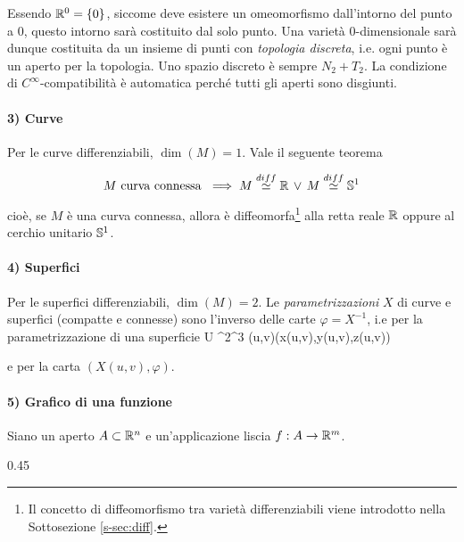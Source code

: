 Essendo $ \R^{0} = \{0\} $, siccome deve esistere un omeomorfismo dall'intorno del punto a $ 0 $, questo intorno sarà costituito dal solo punto. Una varietà 0-dimensionale sarà dunque costituita da un insieme di punti con \textit{topologia discreta}, i.e. ogni punto è un aperto per la topologia. Uno spazio discreto è sempre $ N_{2}+T_{2} $. La condizione di $ C^{\infty} $-compatibilità è automatica perché tutti gli aperti sono disgiunti.

\paragraph{3) Curve}

Per le curve differenziabili, $ \dim (M) = 1 $. Vale il seguente teorema

\begin{theorem}
	\begin{equation}
		M \text{ curva connessa } \implies M \stackrel{diff}{\simeq} \R \, \lor \, M \stackrel{diff}{\simeq} \S^{1}
	\end{equation}

	cioè, se $ M $ è una curva connessa, allora è diffeomorfa\footnote{%
		Il concetto di diffeomorfismo tra varietà differenziabili viene introdotto nella Sottosezione \ref{s-sec:diff}.%
	} alla retta reale $ \R $ oppure al cerchio unitario $ \S^{1} $.
\end{theorem}

\paragraph{4) Superfici}

Per le superfici differenziabili, $ \dim (M) = 2 $. Le \textit{parametrizzazioni} $ X $ di curve e superfici (compatte e connesse) sono l'inverso delle carte $ \varphi = X^{-1} $, i.e per la parametrizzazione di una superficie
%
	{U \subset \R^{2}}{\R^{3}}
	{(u,v)}{(x(u,v),y(u,v),z(u,v))}

e per la carta $ (X(u,v),\varphi) $.

\paragraph{5) Grafico di una funzione}

Siano un aperto $ A \subset \R^{n} $ e un'applicazione liscia $ f : A \to \R^{m} $.

	{0.45}{%
		}


